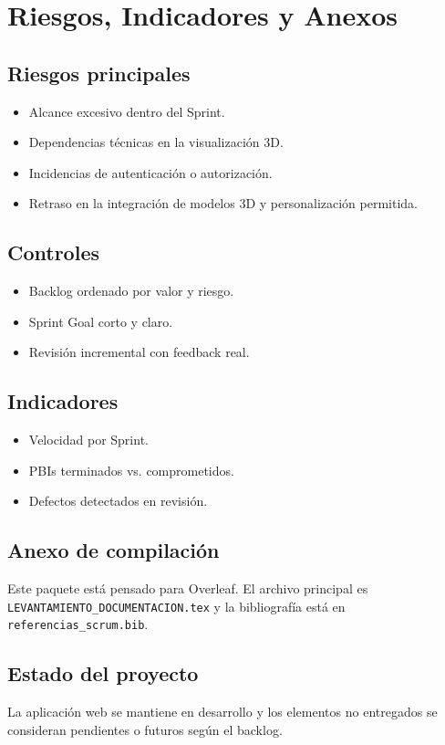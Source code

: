 \section{Riesgos, Indicadores y Anexos}
\subsection{Riesgos principales}
\begin{itemize}[leftmargin=*]
    \item Alcance excesivo dentro del Sprint.
    \item Dependencias t\'ecnicas en la visualizaci\'on 3D.
    \item Incidencias de autenticaci\'on o autorizaci\'on.
    \item Retraso en la integraci\'on de modelos 3D y personalizaci\'on permitida.
\end{itemize}

\subsection{Controles}
\begin{itemize}[leftmargin=*]
    \item Backlog ordenado por valor y riesgo.
    \item Sprint Goal corto y claro.
    \item Revisi\'on incremental con feedback real.
\end{itemize}

\subsection{Indicadores}
\begin{itemize}[leftmargin=*]
    \item Velocidad por Sprint.
    \item PBIs terminados vs. comprometidos.
    \item Defectos detectados en revisi\'on.
\end{itemize}

\subsection{Anexo de compilaci\'on}
Este paquete est\'a pensado para Overleaf. El archivo principal es \texttt{LEVANTAMIENTO_DOCUMENTACION.tex} y la bibliograf\'ia est\'a en \texttt{referencias\_scrum.bib}.

\subsection{Estado del proyecto}
La aplicaci\'on web se mantiene en desarrollo y los elementos no entregados se consideran pendientes o futuros seg\'un el backlog.
